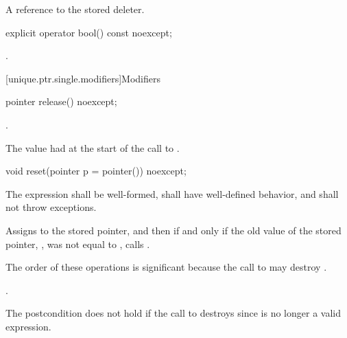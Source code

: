 \begin{itemdescr}
\pnum
\returns A reference to the stored deleter.
\end{itemdescr}

%
\begin{itemdecl}
explicit operator bool() const noexcept;
\end{itemdecl}

\begin{itemdescr}
\pnum
\returns {}.
\end{itemdescr}

[unique.ptr.single.modifiers]{Modifiers}

%
\begin{itemdecl}
pointer release() noexcept;
\end{itemdecl}

\begin{itemdescr}
\pnum
\ensures {}.

\pnum
\returns The value  had at the start of
the call to .
\end{itemdescr}

%
\begin{itemdecl}
void reset(pointer p = pointer()) noexcept;
\end{itemdecl}

\begin{itemdescr}
\pnum
\requires The expression  shall be well-formed, shall have
well-defined behavior, and shall not throw exceptions.

\pnum
\effects Assigns  to the stored pointer, and then if and only if the old value of the
stored pointer, , was not equal to , calls
. \begin{note} The order of these operations is significant
because the call to  may destroy . \end{note}

\pnum
\ensures {}.
\begin{note} The postcondition does not hold if the call to 
destroys  since  is no longer a valid expression.
\end{note}
\end{itemdescr}

